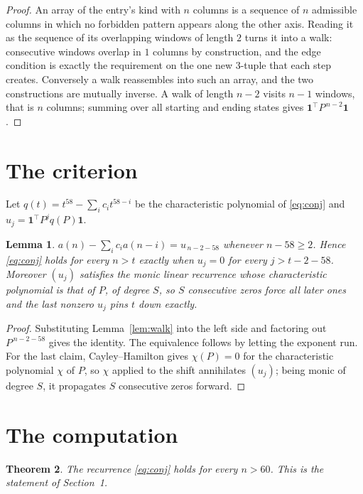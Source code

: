 \documentclass[11pt,a4paper]{article}
\theoremstyle{plain}
\newtheorem{theorem}{Theorem}
\newtheorem{lemma}[theorem]{Lemma}
\theoremstyle{definition}
\begin{document}
\begin{proof}
An array of the entry's kind with $n$ columns is a sequence of $n$ admissible columns in
which no forbidden pattern appears along the other axis. Reading it as the sequence of its
overlapping windows of length $2$ turns it into a walk: consecutive windows overlap in
$1$ columns by construction, and the edge condition is exactly the requirement on the one
new $3$-tuple that each step creates. Conversely a walk reassembles into such an array,
and the two constructions are mutually inverse. A walk of length $n-2$ visits $n-1$
windows, that is $n$ columns; summing over all starting and ending states gives
$\mathbf{1}^{\!\top}P^{\,n-2}\mathbf{1}$.
\end{proof}

\section{The criterion}

Let $q(t)=t^{58}-\sum_i c_i t^{58-i}$ be the characteristic polynomial of
\eqref{eq:conj} and $u_j=\mathbf{1}^{\!\top}P^{j}q(P)\mathbf{1}$.

\begin{lemma}\label{lem:crit}
$a(n)-\sum_i c_i a(n-i)=u_{\,n-2-58}$ whenever $n-58\ge2$. Hence
\eqref{eq:conj} holds for every $n>t$ exactly when $u_j=0$ for every
$j>t-2-58$. Moreover $(u_j)$ satisfies the monic linear recurrence whose
characteristic polynomial is that of $P$, of degree $S$, so $S$ consecutive zeros force all
later ones and the last nonzero $u_j$ pins $t$ down exactly.
\end{lemma}

\begin{proof}
Substituting Lemma~\ref{lem:walk} into the left side and factoring out
$P^{\,n-2-58}$ gives the identity. The equivalence follows by letting the exponent
run. For the last claim, Cayley--Hamilton gives $\chi(P)=0$ for the characteristic
polynomial $\chi$ of $P$, so $\chi$ applied to the shift annihilates $(u_j)$; being monic of
degree $S$, it propagates $S$ consecutive zeros forward.
\end{proof}

\section{The computation}

\begin{theorem}
The recurrence \eqref{eq:conj} holds for every $n>60$. This is the statement of
Section~1.
\end{theorem}
\end{document}
